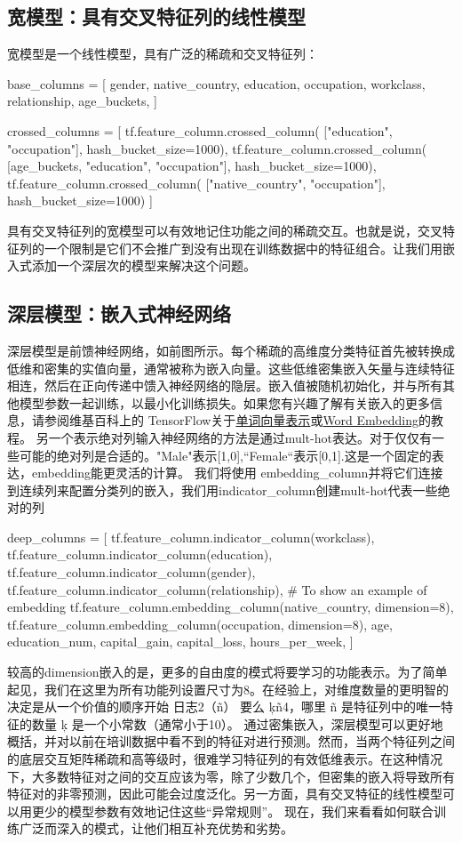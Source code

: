 \subsection{宽模型：具有交叉特征列的线性模型}
宽模型是一个线性模型，具有广泛的稀疏和交叉特征列：
\begin{python}
base_columns = [
    gender, native_country, education, occupation, workclass, relationship,
    age_buckets,
]

crossed_columns = [
    tf.feature_column.crossed_column(
        ["education", "occupation"], hash_bucket_size=1000),
    tf.feature_column.crossed_column(
        [age_buckets, "education", "occupation"], hash_bucket_size=1000),
    tf.feature_column.crossed_column(
        ["native_country", "occupation"], hash_bucket_size=1000)
]
\end{python}
具有交叉特征列的宽模型可以有效地记住功能之间的稀疏交互。也就是说，交叉特征列的一个限制是它们不会推广到没有出现在训练数据中的特征组合。让我们用嵌入式添加一个深层次的模型来解决这个问题。
 
\subsection{深层模型：嵌入式神经网络}
深层模型是前馈神经网络，如前图所示。每个稀疏的高维度分类特征首先被转换成低维和密集的实值向量，通常被称为嵌入向量。这些低维密集嵌入矢量与连续特征相连，然后在正向传递中馈入神经网络的隐层。嵌入值被随机初始化，并与所有其他模型参数一起训练，以最小化训练损失。如果您有兴趣了解有关嵌入的更多信息，请参阅维基百科上的 TensorFlow关于\href{https://www.tensorflow.org/versions/r0.9/tutorials/word2vec/index.html}{单词向量表示}或\href{https://en.wikipedia.org/wiki/Word_embedding}{Word Embedding}的教程。
另一个表示绝对列输入神经网络的方法是通过mult-hot表达。对于仅仅有一些可能的绝对列是合适的。"Male"表示[1,0],``Female``表示[0,1].这是一个固定的表达，embedding能更灵活的计算。
我们将使用 embedding\_column并将它们连接到连续列来配置分类列的嵌入，我们用indicator\_column创建mult-hot代表一些绝对的列
\begin{python}
deep_columns = [
    tf.feature_column.indicator_column(workclass),
    tf.feature_column.indicator_column(education),
    tf.feature_column.indicator_column(gender),
    tf.feature_column.indicator_column(relationship),
    # To show an example of embedding
    tf.feature_column.embedding_column(native_country, dimension=8),
    tf.feature_column.embedding_column(occupation, dimension=8),
    age,
    education_num,
    capital_gain,
    capital_loss,
    hours_per_week,
]
\end{python}
较高的dimension嵌入的是，更多的自由度的模式将要学习的功能表示。为了简单起见，我们在这里为所有功能列设置尺寸为8。在经验上，对维度数量的更明智的决定是从一个价值的顺序开始 日志2⁡（ñ） 要么  ķñ4，哪里  ñ 是特征列中的唯一特征的数量  ķ 是一个小常数（通常小于10）。
通过密集嵌入，深层模型可以更好地概括，并对以前在培训数据中看不到的特征对进行预测。然而，当两个特征列之间的底层交互矩阵稀疏和高等级时，很难学习特征列的有效低维表示。在这种情况下，大多数特征对之间的交互应该为零，除了少数几个，但密集的嵌入将导致所有特征对的非零预测，因此可能会过度泛化。另一方面，具有交叉特征的线性模型可以用更少的模型参数有效地记住这些“异常规则”。
现在，我们来看看如何联合训练广泛而深入的模式，让他们相互补充优势和劣势。
 
